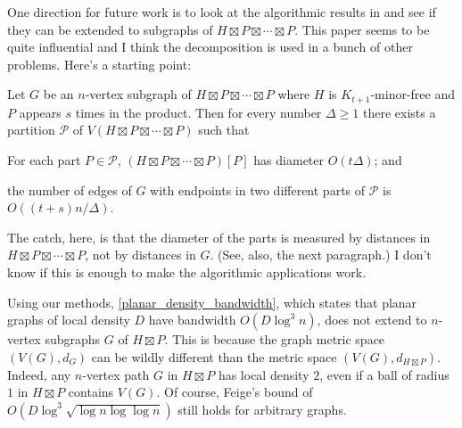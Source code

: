 \documentclass{patmorin}
\begin{document}
\begin{tcolorbox}[width=\textwidth,colback={orange}]
  One direction for future work is to look at the algorithmic results in \citet{klein.plotkin.ea:excluded} and see if they can be extended to subgraphs of $H\boxtimes P\boxtimes\cdots\boxtimes P$.  This paper seems to be quite influential and I think the decomposition is used in a bunch of other problems.  Here's a starting point:

  \begin{thm}
    Let $G$ be an $n$-vertex subgraph of $H\boxtimes P\boxtimes\cdots\boxtimes P$ where $H$ is $K_{t+1}$-minor-free and $P$ appears $s$ times in the product.  Then for every number $\Delta\ge 1$ there exists a partition $\mathcal{P}$ of $V(H\boxtimes P\boxtimes \cdots\boxtimes P)$ such that
    \begin{compactenum}[(i)]
      \item For each part $P\in\mathcal{P}$, $(H\boxtimes P\boxtimes \cdots\boxtimes P)[P]$ has diameter $O(t\Delta)$; and
      \item the number of edges of $G$ with endpoints in two different parts of $\mathcal{P}$ is $O((t+s)n/\Delta)$.
    \end{compactenum}
  \end{thm}
  The catch, here, is that the diameter of the parts is measured by distances in $H\boxtimes P\boxtimes\cdots\boxtimes P$, not by distances in $G$.  (See, also, the next paragraph.)  I don't know if this is enough to make the algorithmic applications work.
\end{tcolorbox}

Using our methods, \cref{planar_density_bandwidth}, which states that planar graphs of local density $D$ have bandwidth $O(D\log^3 n)$, does not extend to $n$-vertex subgraphs $G$ of  $H\boxtimes P$. This is because the graph metric space $(V(G),d_G)$ can be wildly different than the metric space $(V(G),d_{H\boxtimes P})$. Indeed, any $n$-vertex path $G$ in $H\boxtimes P$ has local density $2$, even if a ball of radius $1$ in $H\boxtimes P$ contains $V(G)$.  Of course, Feige's bound of $O(D\log^3\sqrt{\log n\log\log n})$ still holds for arbitrary graphs.

\end{document}
